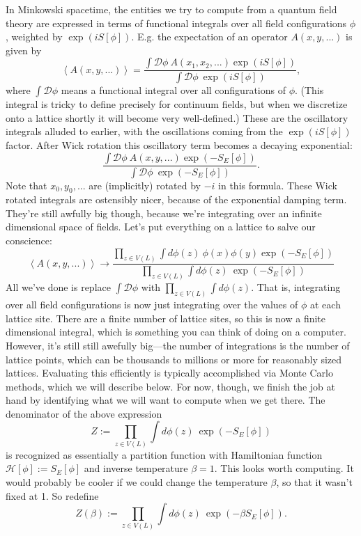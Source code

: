 \documentclass[9pt,twocolumn,twoside]{article}
\begin{document}
In Minkowski spacetime, the entities we try to compute from a quantum field theory are expressed in terms of functional integrals over all field configurations $\phi$, weighted by $\exp(i S[\phi])$.  E.g. the expectation of an operator $A(x,y,...)$ is given by
\[\left<A(x,y,...)\right> = \frac{\int \mathcal{D}\phi \: A(x_1,x_2,...) \exp(i S[\phi])}{\int \mathcal{D}\phi \: \exp(i S[\phi])}, \]
where $\int \mathcal{D}\phi$ means a functional integral over all configurations of $\phi$.  (This integral is tricky to define precisely for continuum fields, but when we discretize onto a lattice shortly it will become very well-defined.)  These are the oscillatory integrals alluded to earlier, with the oscillations coming from the $\exp(i S[\phi])$ factor.  After Wick rotation this oscillatory term becomes a decaying exponential:
\[\frac{\int \mathcal{D}\phi \: A(x,y,...) \exp(-S_E[\phi])}{\int \mathcal{D}\phi \: \exp(-S_E[\phi])}.\]
Note that $x_0,y_0,...$ are (implicitly) rotated by $-i$ in this formula.  These Wick rotated integrals are ostensibly nicer, because of the exponential damping term.  They're still awfully big though, because we're integrating over an infinite dimensional space of fields.  Let's put everything on a lattice to salve our conscience:
\[ \left<A(x,y,...)\right> \rightarrow \frac{\prod_{z\in V(L)}\int d\phi(z) \: \phi(x)\phi(y) \exp(-S_E[\phi])}{\prod_{z\in V(L)}\int d\phi(z) \: \exp(-S_E[\phi])}\]
All we've done is replace $\int \mathcal{D}\phi$ with $\prod_{z\in V(L)}\int d\phi(z)$.  That is, integrating over all field configurations is now just integrating over the values of $\phi$ at each lattice site.  There are a finite number of lattice sites, so this is now a finite dimensional integral, which is something you can think of doing on a computer.  However, it's still still awefully big---the number of integrations is the number of lattice points, which can be thousands to millions or more for reasonably sized lattices.  Evaluating this efficiently is typically accomplished via Monte Carlo methods, which we will describe below.  For now, though, we finish the job at hand by identifying what we will want to compute when we get there.  The denominator of the above expression
\[Z := \prod_{z\in V(L)}\int d\phi(z) \: \exp(-S_E[\phi])\]
is recognized as essentially a partition function with Hamiltonian function $\mathcal{H}[\phi] := S_E[\phi]$ and inverse temperature $\beta=1$.  This looks worth computing.  It would probably be cooler if we could change the temperature $\beta$, so that it wasn't fixed at 1.  So redefine
\[Z(\beta) := \prod_{z\in V(L)}\int d\phi(z) \: \exp(-\beta S_E[\phi]).\]
\end{document}
